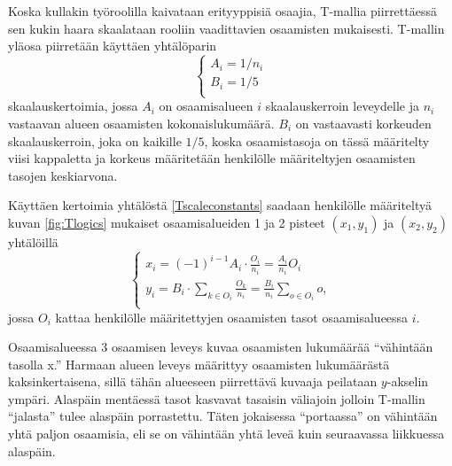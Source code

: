 \documentclass[a4paper,finnish,12pt]{article}
\begin{document}
Koska kullakin työroolilla kaivataan erityyppisiä osaajia, T-mallia piirrettäessä sen kukin haara skaalataan rooliin vaadittavien osaamisten mukaisesti. T-mallin yläosa piirretään käyttäen yhtälöparin %
\begin{equation}
\begin{cases}
A_i = 1/n_i \\
B_i = 1/5 \\
\end{cases}
\label{Tscaleconstants}
\end{equation} skaalauskertoimia, jossa $A_i$ on osaamisalueen $i$ skaalauskerroin leveydelle ja $n_i$ vastaavan alueen osaamisten kokonaislukumäärä. $B_i$ on vastaavasti korkeuden skaalauskerroin, joka on kaikille $1/5$, koska osaamistasoja on tässä määritelty viisi kappaletta ja korkeus määritetään henkilölle määriteltyjen osaamisten tasojen keskiarvona.

Käyttäen kertoimia yhtälöstä \eqref{Tscaleconstants} saadaan henkilölle määriteltyä kuvan \ref{fig:Tlogics} mukaiset osaamisalueiden 1 ja 2 pisteet $(x_1, y_1)$ ja $(x_2, y_2)$ yhtälöillä
\begin{equation}
\begin{cases}
x_i = (-1)^{i-1} A_i \cdot \frac{O_i}{n_i} = \frac{A_i}{n_i} O_i \\
y_i = B_i \cdot \sum_{k \in O_i} \frac{O_k}{n_i} = \frac{B_i}{n_i} \sum_{o \in O_i} o, \\
\end{cases}
\end{equation} jossa $O_i$ kattaa henkilölle määritettyjen osaamisten tasot osaamisalueessa $i$.

Osaamisalueessa 3 osaamisen leveys kuvaa osaamisten lukumäärää ``vähintään tasolla x.'' Harmaan alueen leveys määrittyy osaamisten lukumäärästä kaksinkertaisena, sillä tähän alueeseen piirrettävä kuvaaja peilataan $y$-akselin ympäri. Alaspäin mentäessä tasot kasvavat tasaisin väliajoin jolloin T-mallin ``jalasta'' tulee alaspäin porrastettu. Täten jokaisessa ``portaassa'' on vähintään yhtä paljon osaamisia, eli se on vähintään yhtä leveä kuin seuraavassa liikkuessa alaspäin.
\end{document}
